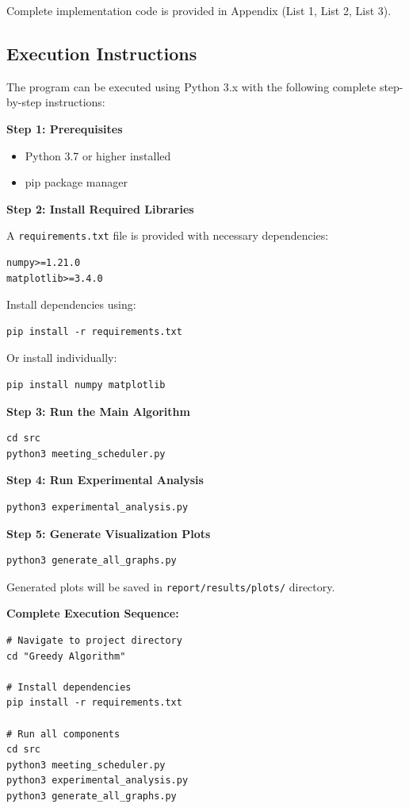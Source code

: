 \documentclass[conference]{IEEEtran}
\begin{document}
Complete implementation code is provided in Appendix (List 1, List 2, List 3).

\subsection{Execution Instructions}

The program can be executed using Python 3.x with the following complete step-by-step instructions:

\textbf{Step 1: Prerequisites}
\begin{itemize}
    \item Python 3.7 or higher installed
    \item pip package manager
\end{itemize}

\textbf{Step 2: Install Required Libraries}

A \texttt{requirements.txt} file is provided with necessary dependencies:
\begin{verbatim}
numpy>=1.21.0
matplotlib>=3.4.0
\end{verbatim}

Install dependencies using:
\begin{verbatim}
pip install -r requirements.txt
\end{verbatim}

Or install individually:
\begin{verbatim}
pip install numpy matplotlib
\end{verbatim}

\textbf{Step 3: Run the Main Algorithm}
\begin{verbatim}
cd src
python3 meeting_scheduler.py
\end{verbatim}

\textbf{Step 4: Run Experimental Analysis}
\begin{verbatim}
python3 experimental_analysis.py
\end{verbatim}

\textbf{Step 5: Generate Visualization Plots}
\begin{verbatim}
python3 generate_all_graphs.py
\end{verbatim}

Generated plots will be saved in \texttt{report/results/plots/} directory.

\textbf{Complete Execution Sequence:}
\begin{verbatim}
# Navigate to project directory
cd "Greedy Algorithm"

# Install dependencies
pip install -r requirements.txt

# Run all components
cd src
python3 meeting_scheduler.py
python3 experimental_analysis.py
python3 generate_all_graphs.py
\end{verbatim}
\end{document}
